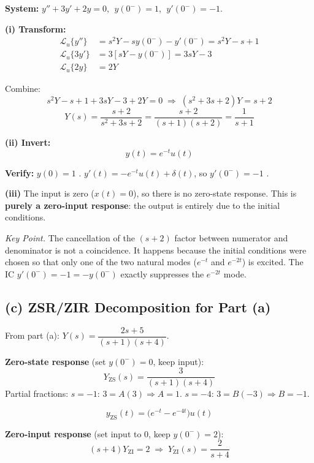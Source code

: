\documentclass[11pt]{article}
\begin{document}
\textbf{System:} $y'' + 3y' + 2y = 0$, $\;y(0^-)=1$, $\;y'(0^-)=-1$.

\textbf{(i) Transform:}
\begin{align*}
\mathcal{L}_u\{y''\} &= s^2Y - sy(0^-) - y'(0^-) = s^2Y - s + 1 \\
\mathcal{L}_u\{3y'\} &= 3[sY - y(0^-)] = 3sY - 3 \\
\mathcal{L}_u\{2y\}  &= 2Y
\end{align*}

Combine:
\[
s^2Y - s + 1 + 3sY - 3 + 2Y = 0 \;\Rightarrow\; (s^2+3s+2)Y = s+2
\]
\[
Y(s) = \frac{s+2}{s^2+3s+2} = \frac{s+2}{(s+1)(s+2)} = \frac{1}{s+1}
\]

\textbf{(ii) Invert:}
\begin{equation*}
\boxed{y(t) = e^{-t}u(t)}
\end{equation*}

\textbf{Verify:} $y(0) = 1$ \checkmark. \quad $y'(t) = -e^{-t}u(t) + \delta(t)$, so $y'(0^-) = -1$ \checkmark.

\textbf{(iii)} The input is zero ($x(t)=0$), so there is no zero-state response. This is
\textbf{purely a zero-input response}: the output is entirely due to the initial conditions.

\medskip
\noindent\textit{Key Point.} The cancellation of the $(s+2)$ factor between numerator and
denominator is not a coincidence. It happens because the initial conditions were chosen so that
only one of the two natural modes ($e^{-t}$ and $e^{-2t}$) is excited. The IC $y'(0^-) = -1 = -y(0^-)$
exactly suppresses the $e^{-2t}$ mode.

\subsection*{(c) ZSR/ZIR Decomposition for Part (a)}

From part (a): $Y(s) = \dfrac{2s+5}{(s+1)(s+4)}$.

\textbf{Zero-state response} (set $y(0^-)=0$, keep input):
\[
Y_{\mathrm{ZS}}(s) = \frac{3}{(s+1)(s+4)}
\]
Partial fractions: $s=-1$: $3 = A(3) \Rightarrow A=1$. \quad $s=-4$: $3 = B(-3) \Rightarrow B=-1$.

\begin{equation*}
\boxed{y_{\mathrm{ZS}}(t) = \bigl(e^{-t} - e^{-4t}\bigr)u(t)}
\end{equation*}

\textbf{Zero-input response} (set input to 0, keep $y(0^-)=2$):
\[
(s+4)Y_{\mathrm{ZI}} = 2 \;\Rightarrow\; Y_{\mathrm{ZI}}(s) = \frac{2}{s+4}
\]
\end{document}
